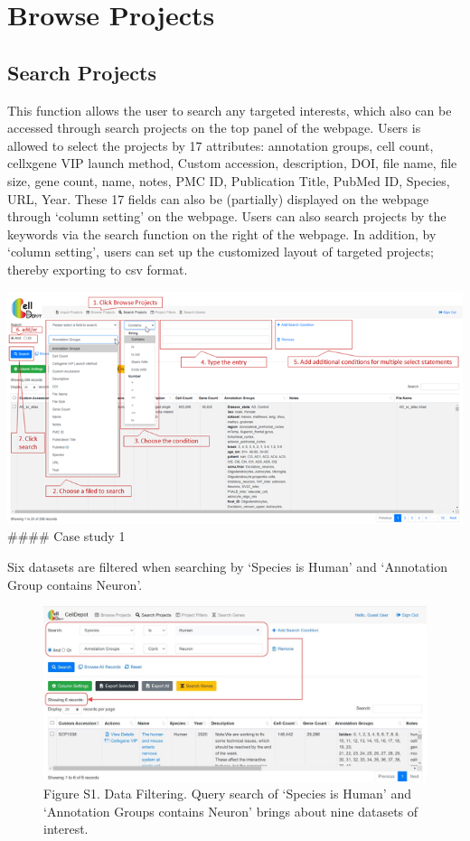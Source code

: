 \documentclass[
]{book}
\begin{document}
\hypertarget{browse-projects}{%
\section{Browse Projects}\label{browse-projects}}

\hypertarget{search-projects}{%
\subsection{Search Projects}\label{search-projects}}

This function allows the user to search any targeted interests, which also can be accessed through search projects on the top panel of the webpage. Users is allowed to select the projects by 17 attributes: annotation groups, cell count, cellxgene VIP launch method, Custom accession, description, DOI, file name, file size, gene count, name, notes, PMC ID, Publication Title, PubMed ID, Species, URL, Year. These 17 fields can also be (partially) displayed on the webpage through `column setting' on the webpage. Users can also search projects by the keywords via the search function on the right of the webpage. In addition, by `column setting', users can set up the customized layout of targeted projects; thereby exporting to csv format.

\includegraphics{figures/S6.png}
\#\#\#\# Case study 1

Six datasets are filtered when searching by `Species is Human' and `Annotation Group contains Neuron'.

\begin{figure}
\centering
\includegraphics{figures/S1.jpg}
\caption{Figure S1. Data Filtering. Query search of `Species is Human' and `Annotation Groups contains Neuron' brings about nine datasets of interest.}
\end{figure}
\end{document}
